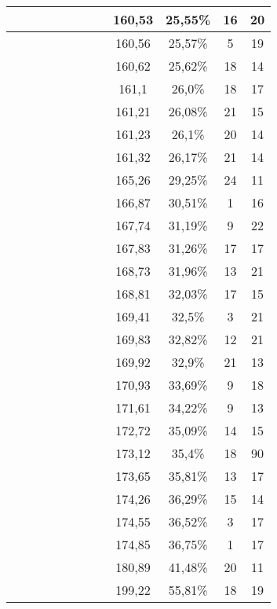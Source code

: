 \begin{center}
\begin{longtable}{|c|c|c|c|c|c|c|c|c|c|c|c|}
 \x &  \x &  &  \x &  \x &  \x &  &  \x & 160,53 & 25,55\% & 16 & 20  \\ \hline
 \x &  &  &  &  \x &  \x &  \x &  \x & 160,56 & 25,57\% & 5 & 19  \\ \hline
 \x &  \x &  \x &  \x &  \x &  \x &  \x &  & 160,62 & 25,62\% & 18 & 14  \\ \hline
 \x &  &  \x &  \x &  \x &  \x &  \x &  & 161,1 & 26,0\% & 18 & 17  \\ \hline
 \x &  &  &  \x &  \x &  &  &  & 161,21 & 26,08\% & 21 & 15  \\ \hline
 \x &  &  \x &  &  \x &  \x &  \x &  \x & 161,23 & 26,1\% & 20 & 14  \\ \hline
 \x &  &  \x &  &  \x &  &  \x &  & 161,32 & 26,17\% & 21 & 14  \\ \hline
 \x &  &  &  \x &  \x &  &  \x &  \x & 165,26 & 29,25\% & 24 & 11  \\ \hline
 \x &  &  &  \x &  \x &  \x &  \x &  & 166,87 & 30,51\% & 1 & 16  \\ \hline
 \x &  &  &  \x &  &  \x &  \x &  & 167,74 & 31,19\% & 9 & 22  \\ \hline
 \x &  &  &  \x &  &  &  \x &  & 167,83 & 31,26\% & 17 & 17  \\ \hline
 \x &  \x &  &  \x &  \x &  \x &  \x &  & 168,73 & 31,96\% & 13 & 21  \\ \hline
 \x &  \x &  &  \x &  \x &  &  \x &  & 168,81 & 32,03\% & 17 & 15  \\ \hline
 \x &  \x &  \x &  &  \x &  \x &  \x &  \x & 169,41 & 32,5\% & 3 & 21  \\ \hline
 \x &  \x &  \x &  \x &  \x &  &  \x &  & 169,83 & 32,82\% & 12 & 21  \\ \hline
 \x &  &  &  \x &  \x &  \x &  \x &  \x & 169,92 & 32,9\% & 21 & 13  \\ \hline
 \x &  \x &  &  \x &  &  \x &  \x &  & 170,93 & 33,69\% & 9 & 18  \\ \hline
 \x &  &  \x &  \x &  \x &  \x &  \x &  \x & 171,61 & 34,22\% & 9 & 13  \\ \hline
 \x &  &  \x &  \x &  &  \x &  \x &  & 172,72 & 35,09\% & 14 & 15  \\ \hline
 \x &  &  &  &  \x &  \x &  \x &  & 173,12 & 35,4\% & 18 & 90  \\ \hline
 \x &  &  \x &  \x &  &  \x &  \x &  \x & 173,65 & 35,81\% & 13 & 17  \\ \hline
 \x &  \x &  \x &  \x &  \x &  \x &  \x &  \x & 174,26 & 36,29\% & 15 & 14  \\ \hline
 \x &  \x &  &  \x &  &  \x &  \x &  \x & 174,55 & 36,52\% & 3 & 17  \\ \hline
 \x &  &  &  \x &  &  \x &  \x &  \x & 174,85 & 36,75\% & 1 & 17  \\ \hline
 \x &  \x &  \x &  &  \x &  \x &  \x &  & 180,89 & 41,48\% & 20 & 11  \\ \hline
 \x &  \x &  &  &  \x &  \x &  \x &  \x & 199,22 & 55,81\% & 18 & 19  \\ \hline
\end{longtable}
\label{table:windProdInputParams}
\end{center}
\normalsize


